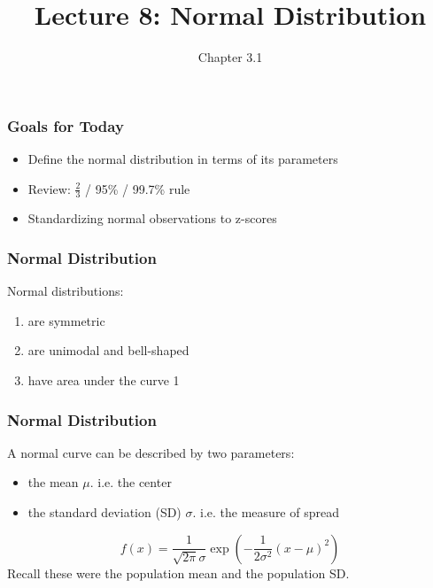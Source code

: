 \documentclass[slides]{beamer}
\title{Lecture 8: Normal Distribution}
\author{Chapter 3.1}
\date{}
\newcommand{\blue}[1]{\textcolor{blue2}{#1}}
\begin{document}
\begin{frame}
\titlepage
\end{frame}


\begin{frame}
\frametitle{Goals for Today}

\begin{itemize}
\item Define the normal distribution in terms of its \blue{parameters}
\item Review: $\frac{2}{3}$ / 95\% / 99.7\% rule
\item Standardizing normal observations to \blue{z-scores}
\end{itemize}


\end{frame}


\begin{frame}[fragile]
\frametitle{Normal Distribution}
Normal distributions:
\begin{enumerate}
\item are symmetric
\item are unimodal and bell-shaped
\item have area under the curve 1
\end{enumerate}

\end{frame}


\begin{frame}[fragile]
\frametitle{Normal Distribution}
%
%
A normal curve can be described by two \blue{parameters}:
\begin{itemize}
\item the \blue{mean $\mu$}. i.e. the center
\item the \blue{standard deviation (SD) $\sigma$}. i.e. the measure of spread
\end{itemize}
\pause\vspace{0.25cm}
\[
f(x) = \frac{1}{\sqrt{2\pi}\sigma}\exp\left( -\frac{1}{2\sigma^2}(x-\mu)^2 \right)
\]
\pause\vspace{0.25cm}
Recall these were the \blue{population mean} and the \blue{population SD}.

\end{frame}
\end{document}
